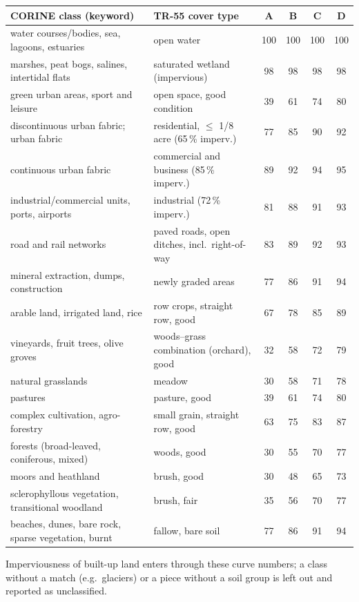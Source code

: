 \documentclass[11pt]{article}
\begin{document}
\begin{center}
\begin{tabular}{p{5.0cm} p{5.6cm} cccc}
\toprule
CORINE class (keyword) & TR-55 cover type & A & B & C & D \\
\midrule
water courses/bodies, sea, lagoons, estuaries & open water & 100 & 100 & 100 & 100 \\
marshes, peat bogs, salines, intertidal flats & saturated wetland (impervious) & 98 & 98 & 98 & 98 \\
green urban areas, sport and leisure & open space, good condition & 39 & 61 & 74 & 80 \\
discontinuous urban fabric; urban fabric & residential, $\le$ 1/8 acre (65\,\% imperv.) & 77 & 85 & 90 & 92 \\
continuous urban fabric & commercial and business (85\,\% imperv.) & 89 & 92 & 94 & 95 \\
industrial/commercial units, ports, airports & industrial (72\,\% imperv.) & 81 & 88 & 91 & 93 \\
road and rail networks & paved roads, open ditches, incl.\ right-of-way & 83 & 89 & 92 & 93 \\
mineral extraction, dumps, construction & newly graded areas & 77 & 86 & 91 & 94 \\
arable land, irrigated land, rice & row crops, straight row, good & 67 & 78 & 85 & 89 \\
vineyards, fruit trees, olive groves & woods--grass combination (orchard), good & 32 & 58 & 72 & 79 \\
natural grasslands & meadow & 30 & 58 & 71 & 78 \\
pastures & pasture, good & 39 & 61 & 74 & 80 \\
complex cultivation, agro-forestry & small grain, straight row, good & 63 & 75 & 83 & 87 \\
forests (broad-leaved, coniferous, mixed) & woods, good & 30 & 55 & 70 & 77 \\
moors and heathland & brush, good & 30 & 48 & 65 & 73 \\
sclerophyllous vegetation, transitional woodland & brush, fair & 35 & 56 & 70 & 77 \\
beaches, dunes, bare rock, sparse vegetation, burnt & fallow, bare soil & 77 & 86 & 91 & 94 \\
\bottomrule
\end{tabular}
\end{center}

Imperviousness of built-up land enters through these curve numbers; a class without a match (e.g.\ glaciers) or a piece without a soil group is left out and reported as unclassified.
\end{document}
